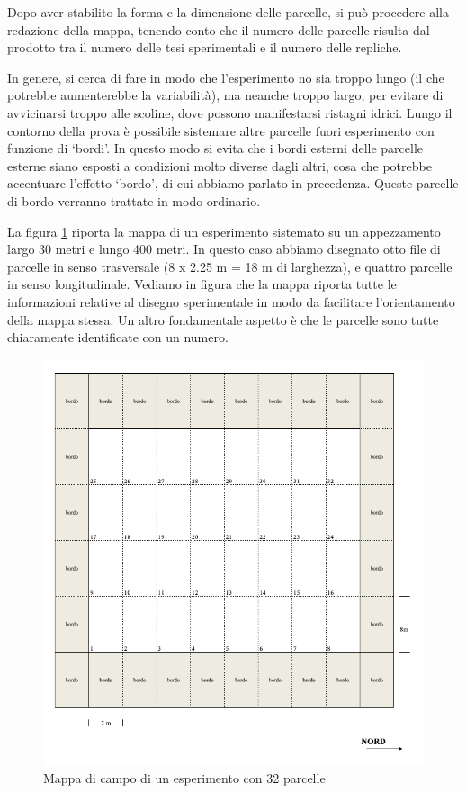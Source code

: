 \documentclass[a4paper,12pt,oneside]{book}
\begin{document}
Dopo aver stabilito la forma e la dimensione delle parcelle, si può procedere alla redazione della mappa, tenendo conto che il numero delle parcelle risulta dal prodotto tra il numero delle tesi sperimentali e il numero delle repliche.

In genere, si cerca di fare in modo che l'esperimento no sia troppo lungo (il che potrebbe aumenterebbe la variabilità), ma neanche troppo largo, per evitare di avvicinarsi troppo alle scoline, dove possono manifestarsi ristagni idrici. Lungo il contorno della prova è possibile sistemare altre parcelle fuori esperimento con funzione di `bordi'. In questo modo si evita che i bordi esterni delle parcelle esterne siano esposti a condizioni molto diverse dagli altri, cosa che potrebbe accentuare l'effetto `bordo', di cui abbiamo parlato in precedenza. Queste parcelle di bordo verranno trattate in modo ordinario.

La figura \ref{fig:figName31} riporta la mappa di un esperimento sistemato su un appezzamento largo 30 metri e lungo 400 metri. In questo caso abbiamo disegnato otto file di parcelle in senso trasversale (8 x 2.25 m = 18 m di larghezza), e quattro parcelle in senso longitudinale. Vediamo in figura che la mappa riporta tutte le informazioni relative al disegno sperimentale in modo da facilitare l'orientamento della mappa stessa. Un altro fondamentale aspetto è che le parcelle sono tutte chiaramente identificate con un numero.

\begin{figure}

{\centering \includegraphics[width=0.9\linewidth]{_images/Mappa1} 

}

\caption{Mappa di campo di un esperimento con 32 parcelle}\label{fig:figName31}
\end{figure}
\end{document}
